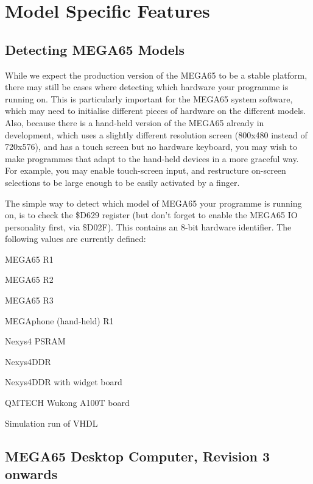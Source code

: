 \chapter{Model Specific Features}

\section{Detecting MEGA65 Models}

While we expect the production version of the MEGA65 to be a stable platform, there may still be
cases where detecting which hardware your programme is running on. This is particularly important
for the MEGA65 system software, which may need to initialise different pieces of hardware on the
different models.  Also, because there is a hand-held version of the MEGA65 already  in development,
which uses a slightly different resolution screen (800x480 instead of 720x576), and has a touch
screen but no hardware keyboard, you may wish to make programmes that adapt to the hand-held
devices in a more graceful way. For example, you may enable touch-screen input, and restructure
on-screen selections to be large enough to be easily activated by a finger.

The simple way to detect which model of MEGA65 your programme is running on, is to check the
\$D629 register (but don't forget to enable the MEGA65 IO personality first, via \$D02F).
This contains an 8-bit hardware identifier.  The following values are currently defined:

\begin{description}[align=left,labelwidth=0.2cm]
\item[\$01 (1)] MEGA65 R1
\item[\$02 (2)] MEGA65 R2
\item[\$03 (3)] MEGA65 R3
\item[\$21 (33)] MEGAphone (hand-held) R1
\item[\$40 (64)] Nexys4 PSRAM
\item[\$41 (65)] Nexys4DDR
\item[\$42 (66)] Nexys4DDR with widget board
\item[\$FD (253)] QMTECH Wukong A100T board
\item[\$FE (254)] Simulation run of VHDL
\end{description}


\section{MEGA65 Desktop Computer, Revision 3 onwards}

